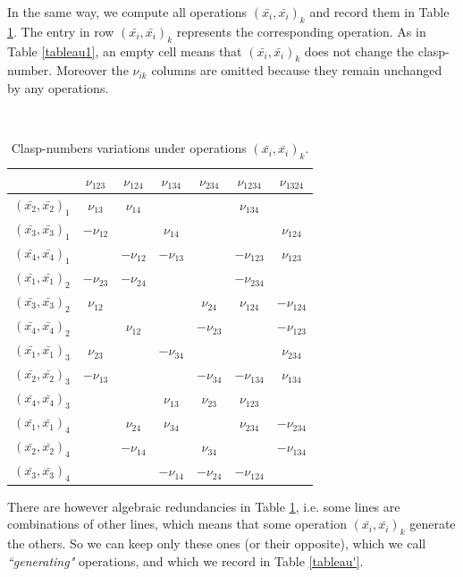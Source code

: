 \documentclass[11pt, a4paper, twoside,reqno]{amsart}
\begin{document}
In the same way, we compute all operations $(\bar{x_i},\bar{x_i})_k$ and record them in Table \ref{tableau}. The entry in row $(\bar{x_i},\bar{x_i})_k$ represents the corresponding operation. As in Table \ref{tableau1}, an empty cell means that $(\bar{x_i},\bar{x_i})_k$ does not change the clasp-number. Moreover the $\nu_{ik}$ columns are omitted because they remain unchanged by any operations. 

\

\begin{table}[!htbp]
\centering
\begin{tabular}{|c||c|c|c|c|c|c|}
\hline
&$\nu_{123}$&$\nu_{124}$&$\nu_{134}$&$\nu_{234}$&$\nu_{1234}$&$\nu_{1324}$\\
\hline\hline
$(\bar{x_2},\bar{x_2})_1$&$\nu_{13}$&$\nu_{14}$&&&$\nu_{134}$&\\
\hline
$(\bar{x_3},\bar{x_3})_1$&$-\nu_{12}$&&$\nu_{14}$&&&$\nu_{124}$\\
\hline
$(\bar{x_4},\bar{x_4})_1$&&$-\nu_{12}$&$-\nu_{13}$&&$-\nu_{123}$&$\nu_{123}$\\
\hline\hline
$(\bar{x_1},\bar{x_1})_2$&$-\nu_{23}$&$-\nu_{24}$&&&$-\nu_{234}$&\\
\hline
$(\bar{x_3},\bar{x_3})_2$&$\nu_{12}$&&&$\nu_{24}$&$\nu_{124}$&$-\nu_{124}$\\
\hline
$(\bar{x_4},\bar{x_4})_2$&&$\nu_{12}$&&$-\nu_{23}$&&$-\nu_{123}$\\
\hline\hline
$(\bar{x_1},\bar{x_1})_3$&$\nu_{23}$&&$-\nu_{34}$&&&$\nu_{234}$\\
\hline
$(\bar{x_2},\bar{x_2})_3$&$-\nu_{13}$&&&$-\nu_{34}$&$-\nu_{134}$&$\nu_{134}$\\
\hline
$(\bar{x_4},\bar{x_4})_3$&&&$\nu_{13}$&$\nu_{23}$&$\nu_{123}$&\\
\hline\hline
$(\bar{x_1},\bar{x_1})_4$&&$\nu_{24}$&$\nu_{34}$&&$\nu_{234}$&$-\nu_{234}$\\
\hline
$(\bar{x_2},\bar{x_2})_4$&&$-\nu_{14}$&&$\nu_{34}$&&$-\nu_{134}$\\
\hline
$(\bar{x_3},\bar{x_3})_4$&&&$-\nu_{14}$&$-\nu_{24}$&$-\nu_{124}$&\\
\hline
\end{tabular}
\vspace{0.08cm}
\caption{Clasp-numbers variations under operations $(\bar{x_i},\bar{x_i})_k$.}
\label{tableau}
\end{table}

There are however algebraic redundancies in Table \ref{tableau}, i.e. some lines are combinations of other lines, which means that some operation $(\bar{x_i},\bar{x_i})_k$ generate the others. So we can keep only these ones (or their opposite), which we call \emph{“generating"} operations, and which we record in Table \ref{tableau'}.
\end{document}
